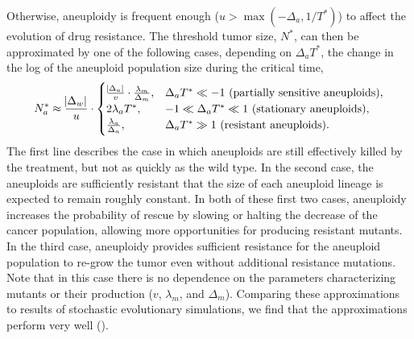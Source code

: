 \documentclass[12pt]{extarticle}
\begin{document}
Otherwise, aneuploidy is frequent enough ($u > \max{(-\Delta_a, 1/T^*)}$) to affect the evolution of drug resistance. 
The threshold tumor size, $N^*$, can then be approximated by one of the following cases, depending on $\Delta_a T^*$, the change in the log of the aneuploid population size during the critical time,
\begin{equation}  \label{eq:N_a}
\begin{aligned}
N_a^* \approx 
  \frac{\abs{\Delta_w}}{u} \cdot \begin{cases}
    \frac{\abs{\Delta_a}}{v} \cdot \frac{\lambda_m}{\Delta_m} ,&
  \Delta_a T^* \ll -1 \text{ (partially sensitive aneuploids)},\\ 
  2\lambda_a T^* ,&
  -1 \ll \Delta_a T^* \ll 1  \text{ (stationary aneuploids)},\\ 
  \frac{\lambda_a}{\Delta_a} ,&
   \Delta_a T^* \gg 1 \text{ (resistant aneuploids)}.
  \end{cases}
\end{aligned}
\end{equation}
The first line describes the case in which aneuploids are still effectively killed by the treatment, but not as quickly as the wild type. 
In the second case, the aneuploids are sufficiently resistant that the size of each aneuploid lineage is expected to remain roughly constant. 
In both of these first two cases, aneuploidy increases the probability of rescue by slowing or halting the decrease of the cancer population, allowing more opportunities for producing resistant mutants. 
In the third case, aneuploidy provides sufficient resistance for the aneuploid population to re-grow the tumor even without additional resistance mutations.
Note that in this case there is no dependence on the parameters characterizing mutants or their production ($v$, $\lambda_m$, and $\Delta_m$).
Comparing these approximations to results of stochastic evolutionary simulations, we find that the approximations perform very well ().%
\end{document}
